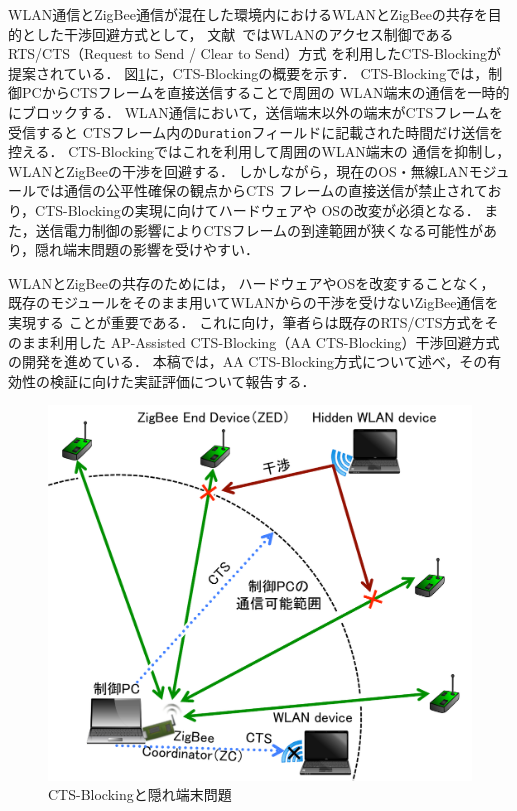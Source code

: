\documentclass[12pt]{jreport}
\begin{document}
WLAN通信とZigBee通信が混在した環境内におけるWLANとZigBeeの共存を目的とした干渉回避方式として，
文献~\cite{hou09:minimize_intf}ではWLANのアクセス制御であるRTS/CTS（Request to Send / Clear to Send）方式
を利用したCTS-Blockingが提案されている．
図\ref{fig:cts_blocking}に，CTS-Blockingの概要を示す．
CTS-Blockingでは，制御PCからCTSフレームを直接送信することで周囲の
WLAN端末の通信を一時的にブロックする．
WLAN通信において，送信端末以外の端末がCTSフレームを受信すると
CTSフレーム内の\texttt{Duration}フィールドに記載された時間だけ送信を控える．
CTS-Blockingではこれを利用して周囲のWLAN端末の
通信を抑制し，WLANとZigBeeの干渉を回避する．
しかしながら，現在のOS・無線LANモジュールでは通信の公平性確保の観点からCTS
フレームの直接送信が禁止されており，CTS-Blockingの実現に向けてハードウェアや
OSの改変が必須となる．
また，送信電力制御の影響によりCTSフレームの到達範囲が狭くなる可能性があり，隠れ端末問題の影響を受けやすい．

WLANとZigBeeの共存のためには，
ハードウェアやOSを改変することなく，
既存のモジュールをそのまま用いてWLANからの干渉を受けないZigBee通信を実現する
ことが重要である．
これに向け，筆者らは既存のRTS/CTS方式をそのまま利用した
AP-Assisted CTS-Blocking（AA CTS-Blocking）干渉回避方式の開発を進めている．
本稿では，AA CTS-Blocking方式について述べ，その有効性の検証に向けた実証評価について報告する．

\begin{figure}[bt]
 \centering
 \includegraphics[width=\columnwidth]{figure/cts_blocking.pdf}
 \caption{CTS-Blockingと隠れ端末問題}
 \label{fig:cts_blocking}
\end{figure}
\end{document}
